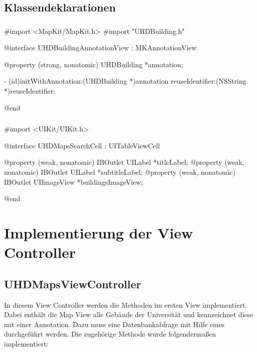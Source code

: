 \documentclass{report}
\begin{document}
\subsection{Klassendeklarationen}

\vspace{0,5cm}

\subsubsection{}

\begin{objclst}
#import <MapKit/MapKit.h>
#import "UHDBuilding.h"

@interface UHDBuildingAnnotationView : MKAnnotationView

@property (strong, nonatomic) UHDBuilding *annotation;

- (id)initWithAnnotation:(UHDBuilding *)annotation reuseIdentifier:(NSString *)reuseIdentifier;

@end
\end{objclst}

\vspace{0,5cm}

\subsubsection{}

\begin{objclst}
#import <UIKit/UIKit.h>

@interface UHDMapsSearchCell : UITableViewCell

@property (weak, nonatomic) IBOutlet UILabel *titleLabel;
@property (weak, nonatomic) IBOutlet UILabel *subtitleLabel;
@property (weak, nonatomic) IBOutlet UIImageView *buildingsImageView;

@end
\end{objclst}

\newpage

\section{Implementierung der View Controller}

\subsection{UHDMapsViewController}\label{subsection_2}

In diesem View Controller werden die Methoden im ersten View implementiert. Dabei enthält die Map View alle Gebäude der Universität und kennzeichnet diese mit einer Annotation. Dazu muss eine Datenbankabfrage mit Hilfe eines  durchgeführt werden. Die zugehörige Methode wurde folgendermaßen implementiert:
\end{document}
